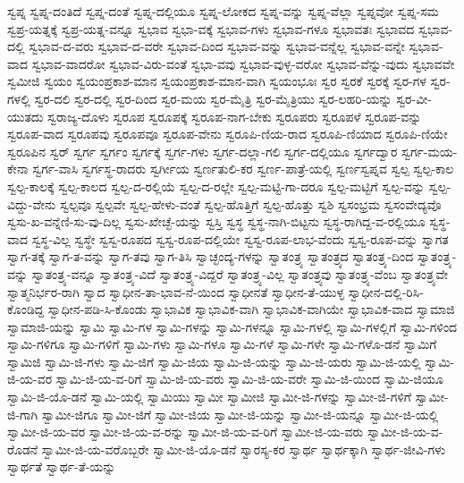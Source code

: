 {ಸ್ವಪ್ನ
ಸ್ವಪ್ನ-ದಂತಿದೆ
ಸ್ವಪ್ನ-ದಂತೆ
ಸ್ವಪ್ನ-ದಲ್ಲಿಯೂ
ಸ್ವಪ್ನ-ಲೋಕದ
ಸ್ವಪ್ನ-ವನ್ನು
ಸ್ವಪ್ನ-ವೆಲ್ಲಾ
ಸ್ವಪ್ನವೋ
ಸ್ವಪ್ನ-ಸಮ
ಸ್ವಪ್ರ-ಯತ್ನಕ್ಕೆ
ಸ್ವಪ್ರ-ಯತ್ನ-ವನ್ನೂ
ಸ್ವಭಾವ
ಸ್ವಭಾ-ವಕ್ಕೆ
ಸ್ವಭಾವ-ಗಳು
ಸ್ವಭಾವ-ಗಳೂ
ಸ್ವಭಾವತಃ
ಸ್ವಭಾವದ
ಸ್ವಭಾವ-ದಲ್ಲಿ
ಸ್ವಭಾವ-ದ-ವರು
ಸ್ವಭಾವ-ದ-ವರೇ
ಸ್ವಭಾವ-ದಿಂದ
ಸ್ವಭಾವ-ವನ್ನು
ಸ್ವಭಾವ-ವನ್ನೆಲ್ಲ
ಸ್ವಭಾವ-ವನ್ನೇ
ಸ್ವಭಾವ-ವಾದ
ಸ್ವಭಾವ-ವಾದರೋ
ಸ್ವಭಾವ-ವಿರು-ವಂತೆ
ಸ್ವಭಾ-ವವು
ಸ್ವಭಾವ-ವುಳ್ಳ-ವರೋ
ಸ್ವಭಾವ-ವೆನ್ನು-ವುದು
ಸ್ವಭಾವವೇ
ಸ್ವಮೀಜಿ
ಸ್ವಯಂ
ಸ್ವಯಂಪ್ರಕಾಶ-ಮಾನ
ಸ್ವಯಂಪ್ರಕಾಶ-ಮಾನ-ವಾಗಿ
ಸ್ವಯಂಭೂಃ
ಸ್ವರ
ಸ್ವರಕೆ
ಸ್ವರಕ್ಕೆ
ಸ್ವರ-ಗಳ
ಸ್ವರ-ಗಳಲ್ಲಿ
ಸ್ವರ-ದಲಿ
ಸ್ವರ-ದಲ್ಲಿ
ಸ್ವರ-ದಿಂದ
ಸ್ವರ-ಮಯ
ಸ್ವರ-ಮೈತ್ರಿ
ಸ್ವರ-ಮೈತ್ರಿಯು
ಸ್ವರ-ಲಹರಿ-ಯನ್ನು
ಸ್ವರ-ವೀ-ಯುತದು
ಸ್ವರಾಜ್ಯ-ದೊಳು
ಸ್ವರೂಪ
ಸ್ವರೂಪಕ್ಕೆ
ಸ್ವರೂಪ-ನಾಗ-ಬೇಕು
ಸ್ವರೂಪರು
ಸ್ವರೂಪಳೆ
ಸ್ವರೂಪ-ವನ್ನು
ಸ್ವರೂಪ-ವಾದ
ಸ್ವರೂಪವು
ಸ್ವರೂಪವೂ
ಸ್ವರೂಪ-ವೇನು
ಸ್ವರೂಪಿ-ಣಿಯ-ರಾದ
ಸ್ವರೂಪಿ-ಣಿಯಾದ
ಸ್ವರೂಪಿ-ಣಿಯೇ
ಸ್ವರೂಪಿನ
ಸ್ವರ್
ಸ್ವರ್ಗ
ಸ್ವರ್ಗಂ
ಸ್ವರ್ಗಕ್ಕೆ
ಸ್ವರ್ಗ-ಗಳು
ಸ್ವರ್ಗ-ದಲ್ಲಾ-ಗಲಿ
ಸ್ವರ್ಗ-ದಲ್ಲಿಯೂ
ಸ್ವರ್ಗದ್ವಾರ
ಸ್ವರ್ಗ-ಮಯ-ಕೇನಾ
ಸ್ವರ್ಗ-ವಾಸಿ
ಸ್ವರ್ಗಸ್ಥ-ರಾದರು
ಸ್ವರ್ಗೀಯ
ಸ್ವರ್ಣತುಲಿ-ಕರ
ಸ್ವರ್ಣ-ಪಾತ್ರೆ-ಯಲ್ಲಿ
ಸ್ವರ್ಣಸ್ವಪ್ನವ
ಸ್ವಲ್ಪ
ಸ್ವಲ್ಪ-ಕಾಲ
ಸ್ವಲ್ಪ-ಕಾಲಕ್ಕೆ
ಸ್ವಲ್ಪ-ಕಾಲದ
ಸ್ವಲ್ಪ-ದ-ರಲ್ಲಿಯೆ
ಸ್ವಲ್ಪ-ದ-ರಲ್ಲೇ
ಸ್ವಲ್ಪ-ಮಟ್ಟಿ-ಗಾ-ದರೂ
ಸ್ವಲ್ಪ-ಮಟ್ಟಿಗೆ
ಸ್ವಲ್ಪ-ವನ್ನು
ಸ್ವಲ್ಪ-ವಿದ್ದು-ವೇನು
ಸ್ವಲ್ಪವೂ
ಸ್ವಲ್ಪವೇ
ಸ್ವಲ್ಪ-ಹೇಳು-ವಂತೆ
ಸ್ವಲ್ಪ-ಹೊತ್ತಿಗೆ
ಸ್ವಲ್ಪ-ಹೊತ್ತು
ಸ್ವಶಿ
ಸ್ವಸಂಭ್ರಮ
ಸ್ವಸಂವೇದ್ಯವೊ
ಸ್ವಸು-ಖ-ವನ್ನೆಣಿ-ಸು-ವು-ದಿಲ್ಲ
ಸ್ವಸು-ಖೇಚ್ಛೆ-ಯನ್ನು
ಸ್ವಸ್ತಿ
ಸ್ವಸ್ಥ
ಸ್ವಸ್ಥ-ನಾಗಿ-ಬಿಟ್ಟನು
ಸ್ವಸ್ಥ-ರಾಗಿದ್ದ-ವ-ರಲ್ಲಿಯೂ
ಸ್ವಸ್ಥ-ವಾದ
ಸ್ವಸ್ಥ-ವಿಲ್ಲ
ಸ್ವಸ್ಥೇ
ಸ್ವಸ್ವ-ರೂಪದ
ಸ್ವಸ್ವ-ರೂಪ-ದಲ್ಲಿಯೇ
ಸ್ವಸ್ವ-ರೂಪ-ಲಾಭ-ವೆಂದು
ಸ್ವಸ್ವ-ರೂಪ-ವನ್ನು
ಸ್ವಾಗತ
ಸ್ವಾಗ-ತಕ್ಕೆ
ಸ್ವಾಗ-ತ-ವನ್ನು
ಸ್ವಾಗ-ತವು
ಸ್ವಾಗ-ತಿಸಿ
ಸ್ವಾಚ್ಛಂದ್ಯ-ಗಳನ್ನು
ಸ್ವಾತಂತ್ರ್ಯ
ಸ್ವಾತಂತ್ರ್ಯದ
ಸ್ವಾತಂತ್ರ್ಯ-ದಿಂದ
ಸ್ವಾತಂತ್ರ್ಯ-ವನ್ನು
ಸ್ವಾತಂತ್ರ್ಯ-ವನ್ನೂ
ಸ್ವಾತಂತ್ರ್ಯ-ವಿದೆ
ಸ್ವಾತಂತ್ರ್ಯ-ವಿದ್ದರೆ
ಸ್ವಾತಂತ್ರ್ಯ-ವಿಲ್ಲ
ಸ್ವಾತಂತ್ರ್ಯವು
ಸ್ವಾತಂತ್ರ್ಯ-ವೆಂಬ
ಸ್ವಾತಂತ್ರ್ಯವೇ
ಸ್ವಾತ್ಮನಿರ್ಭರ-ರಾಗಿ
ಸ್ವಾದ
ಸ್ವಾಧೀನ-ತಾ-ಭಾವ-ನೆ-ಯಿಂದ
ಸ್ವಾಧೀನತೆ
ಸ್ವಾಧೀನ-ತೆ-ಯುಳ್ಳ
ಸ್ವಾಧೀನ-ದಲ್ಲಿ-ರಿಸಿ-ಕೊಂಡಿದ್ದ
ಸ್ವಾಧೀನ-ಪಡಿ-ಸಿ-ಕೊಂಡು
ಸ್ವಾಭಾವಿಕ
ಸ್ವಾಭಾವಿಕ-ವಾಗಿ
ಸ್ವಾಭಾವಿಕ-ವಾಗಿಯೇ
ಸ್ವಾಭಾವಿಕ-ವಾದ
ಸ್ವಾಮಾಜಿ
ಸ್ವಾಮಾಜಿ-ಯನ್ನು
ಸ್ವಾಮಿ
ಸ್ವಾಮಿ-ಗಳ
ಸ್ವಾಮಿ-ಗಳನ್ನು
ಸ್ವಾಮಿ-ಗಳನ್ನೂ
ಸ್ವಾಮಿ-ಗಳಲ್ಲಿ
ಸ್ವಾಮಿ-ಗಳಲ್ಲಿಗೆ
ಸ್ವಾಮಿ-ಗಳಿಂದ
ಸ್ವಾಮಿ-ಗಳಿಗೂ
ಸ್ವಾಮಿ-ಗಳಿಗೆ
ಸ್ವಾಮಿ-ಗಳು
ಸ್ವಾಮಿ-ಗಳೂ
ಸ್ವಾಮಿ-ಗಳೆ
ಸ್ವಾಮಿ-ಗಳೇ
ಸ್ವಾಮಿ-ಗಳೊ-ಡನೆ
ಸ್ವಾಮಿಗೆ
ಸ್ವಾಮಿಜಿ
ಸ್ವಾಮಿ-ಜಿ-ಗಳು
ಸ್ವಾಮಿ-ಜಿಗೆ
ಸ್ವಾಮಿ-ಜಿಯ
ಸ್ವಾಮಿ-ಜಿ-ಯನ್ನು
ಸ್ವಾಮಿ-ಜಿ-ಯರು
ಸ್ವಾಮಿ-ಜಿ-ಯಲ್ಲಿ
ಸ್ವಾಮಿ-ಜಿ-ಯ-ವರ
ಸ್ವಾಮಿ-ಜಿ-ಯ-ವ-ರಿಗೆ
ಸ್ವಾಮಿ-ಜಿ-ಯ-ವರು
ಸ್ವಾಮಿ-ಜಿ-ಯ-ವರೇ
ಸ್ವಾಮಿ-ಜಿ-ಯಿಂದ
ಸ್ವಾಮಿ-ಜಿಯೂ
ಸ್ವಾಮಿ-ಜಿ-ಯೊ-ಡನೆ
ಸ್ವಾಮಿ-ಯಲ್ಲಿ
ಸ್ವಾಮಿಯು
ಸ್ವಾಮೀ
ಸ್ವಾಮೀಜಿ
ಸ್ವಾಮೀ-ಜಿ-ಗಳನ್ನು
ಸ್ವಾಮೀ-ಜಿ-ಗಳಿಗೆ
ಸ್ವಾಮೀ-ಜಿ-ಗಾಗಿ
ಸ್ವಾಮೀ-ಜಿಗೂ
ಸ್ವಾಮೀ-ಜಿಗೆ
ಸ್ವಾಮೀ-ಜಿಯ
ಸ್ವಾಮೀ-ಜಿ-ಯನ್ನು
ಸ್ವಾಮೀ-ಜಿ-ಯನ್ನೂ
ಸ್ವಾಮೀ-ಜಿ-ಯಲ್ಲಿ
ಸ್ವಾಮೀ-ಜಿ-ಯ-ವರ
ಸ್ವಾಮೀ-ಜಿ-ಯ-ವ-ರನ್ನು
ಸ್ವಾಮೀ-ಜಿ-ಯ-ವ-ರಿಗೆ
ಸ್ವಾಮೀ-ಜಿ-ಯ-ವರು
ಸ್ವಾಮೀ-ಜಿ-ಯ-ವ-ರೊಡನೆ
ಸ್ವಾಮೀ-ಜಿ-ಯ-ವರೊಬ್ಬರೇ
ಸ್ವಾಮೀ-ಜಿ-ಯೊ-ಡನೆ
ಸ್ವಾರಸ್ಯ-ಕರ
ಸ್ವಾರ್ಥ
ಸ್ವಾರ್ಥಕ್ಕಾಗಿ
ಸ್ವಾರ್ಥ-ಜೀವಿ-ಗಳು
ಸ್ವಾರ್ಥತೆ
ಸ್ವಾರ್ಥ-ತೆ-ಯನ್ನು
}
